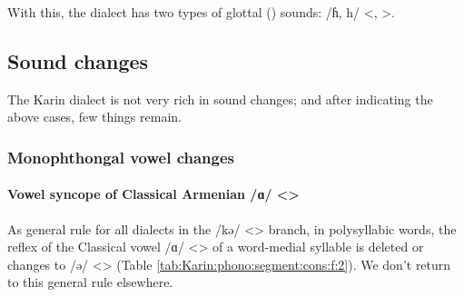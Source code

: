\begin{table}[H]
	\centering
	\caption{Voiced glottal fricative /ɦ/ <> in the Karin dialect}
	\label{tab:Karin:phono:segment:cons:hh}
\end{table}


With this, the dialect has two types of glottal () sounds: /ɦ, h/ <, >. 


\begin{adjarianpage}\label{page:107}\end{adjarianpage}%

\subsection{Sound changes}

The Karin dialect is not very rich in sound changes; and after indicating the above cases, few things remain. 

\subsubsection{Monophthongal vowel changes}
\paragraph{Vowel syncope of Classical Armenian /ɑ/ <>}
As general rule for all dialects in the /kə/ <> branch, in polysyllabic words, the reflex of the Classical vowel /ɑ/ <> of a word-medial syllable is deleted or changes to /ə/ <> (Table \ref{tab:Karin:phono:segment:cons:f:2}). We don't return to this general rule elsewhere. 



